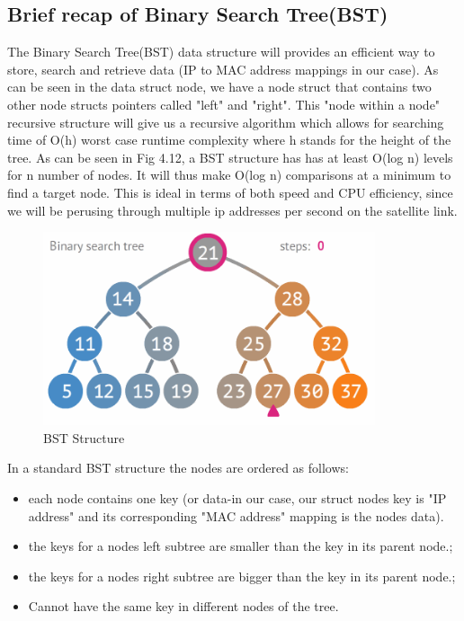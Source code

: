 \begin{appendices}
\subsection*{Brief recap of Binary Search Tree(BST)}
The Binary Search Tree(BST) data structure will provides an efficient way to store, search and retrieve data (IP to MAC address mappings in our case). As can be seen in the data struct node, we have a node struct that contains two other node structs pointers called "left" and "right". This "node within a node" recursive structure will give us a recursive algorithm which allows for searching time of O(h) worst case runtime complexity where h stands for the height of the tree. As can be seen in Fig 4.12, a BST structure has has at least O(log n) levels for n number of nodes. It will thus make O(log n) comparisons at a minimum to find a target node. This is ideal in terms of both speed and CPU efficiency, since we will be perusing through multiple ip addresses per second on the satellite link. 

\begin{figure}[h!]
	\centering
    \includegraphics[width=0.87\textwidth]{BST.PNG}
    \caption{BST Structure}
    \label{fig:BST}
\end{figure}

In a standard BST structure the nodes are ordered as follows:

\begin{itemize}
\item each node contains one key (or data-in our case, our struct nodes key is "IP address" and its corresponding "MAC address" mapping is the nodes data).
\item the keys for a nodes left subtree are smaller than the key in its parent node.;
\item the keys for a nodes right subtree are bigger than the key in its parent node.;
\item Cannot have the same key in different nodes of the tree.\\
\end{itemize}


\end{appendices}
